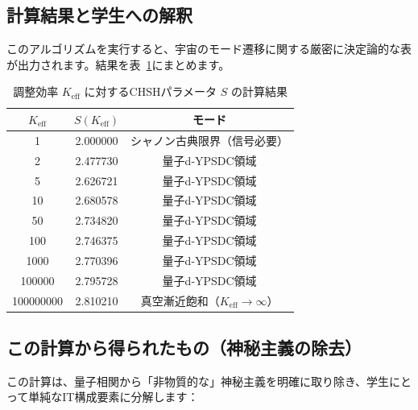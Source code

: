 \documentclass[12pt,a4paper]{article}
\begin{document}
	\subsection{計算結果と学生への解釈}
	
	このアルゴリズムを実行すると、宇宙のモード遷移に関する厳密に決定論的な表が出力されます。結果を表~\ref{tab:bell_yuct}にまとめます。
	
	\begin{table}[htbp]
		\centering
		\small
		\setlength{\tabcolsep}{4pt}
		\caption{調整効率 \(K_{\mathrm{eff}}\) に対するCHSHパラメータ \(S\) の計算結果}
		\label{tab:bell_yuct}
		\begin{tabular}{ccc}
			\toprule
			\(K_{\mathrm{eff}}\) & \(S(K_{\mathrm{eff}})\) & モード \\
			\midrule
			1            & 2.000000 & シャノン古典限界（信号必要） \\
			2            & 2.477730 & 量子d‑YPSDC領域 \\
			5            & 2.626721 & 量子d‑YPSDC領域 \\
			10           & 2.680578 & 量子d‑YPSDC領域 \\
			50           & 2.734820 & 量子d‑YPSDC領域 \\
			100          & 2.746375 & 量子d‑YPSDC領域 \\
			1000         & 2.770396 & 量子d‑YPSDC領域 \\
			100000       & 2.795728 & 量子d‑YPSDC領域 \\
			100000000    & 2.810210 & 真空漸近飽和（\(K_{\mathrm{eff}} \to \infty\)） \\
			\bottomrule
		\end{tabular}
	\end{table}
	
	\subsection{この計算から得られたもの（神秘主義の除去）}
	
	この計算は、量子相関から「非物質的な」神秘主義を明確に取り除き、学生にとって単純なIT構成要素に分解します：
	
\end{document}
